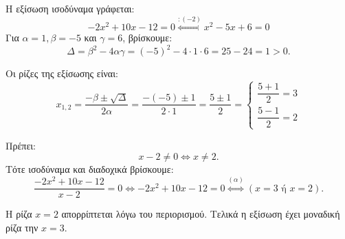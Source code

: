 
\begin{alist}
\item Η εξίσωση ισοδύναμα γράφεται:
\[-2x^2 + 10x - 12 = 0 \stackrel{:(-2)}{\Leftrightarrow} x^2 - 5x + 6 = 0\]
Για $\alpha = 1, \beta = -5$ και $\gamma = 6$, βρίσκουμε:
\[\Delta = \beta^2 - 4\alpha\gamma = (-5)^2 - 4 \cdot 1 \cdot 6 = 25 - 24 = 1 > 0.\]

Οι ρίζες της εξίσωσης είναι:
\[x_{1,2} = \dfrac{-\beta \pm \sqrt{\Delta}}{2\alpha} = \dfrac{-(-5) \pm 1}{2 \cdot 1} = \dfrac{5 \pm 1}{2} = \begin{cases} \dfrac{5 + 1}{2} = 3 \\ \dfrac{5 - 1}{2} = 2 \end{cases}\]

\item Πρέπει:
\[x - 2 \ne 0 \Leftrightarrow x \ne 2.\]
Τότε ισοδύναμα και διαδοχικά βρίσκουμε:
\[\dfrac{-2x^2 + 10x - 12}{x - 2} = 0 \Leftrightarrow -2x^2 + 10x - 12 = 0 \stackrel{(\alpha)}{\Leftrightarrow} (x = 3 \text{ ή } x = 2).\]

Η ρίζα $x = 2$ απορρίπτεται λόγω του περιορισμού.
Τελικά η εξίσωση έχει μοναδική ρίζα την $x = 3$.
\end{alist}

